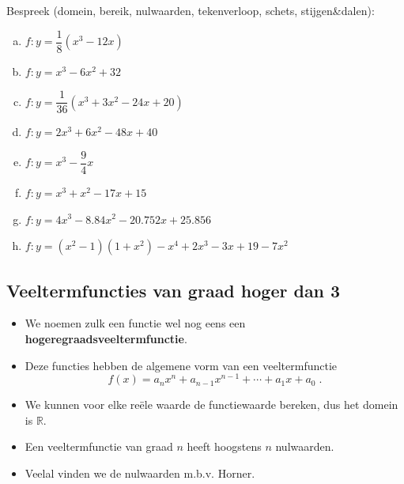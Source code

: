 \documentclass[12pt,twoside,a4paper]{article}
\begin{document}
\begin{oefening}
Bespreek (domein, bereik, nulwaarden, tekenverloop, schets, stijgen\&dalen):
\begin{multicols}{2}
\begin{enumerate}[(a)]
  \itemsep.8em
  \item $f:y=\dfrac{1}{8}(x^3-12x)$
  \item $f:y=x^3-6x^2+32$
  \item $f:y=\dfrac{1}{36}(x^3+3x^2-24x+20)$
  \item $f:y=2x^3+6x^2-48x+40$
  \item $f:y=x^3-\dfrac{9}{4}x$
  \item $f:y=x^3+x^2-17x+15$
  \item $f:y=4x^3-8.84x^2-20.752x+25.856$
  \item $f:y=(x^2-1)(1+x^2)-x^4+2x^3-3x+19-7x^2$
\end{enumerate}
\end{multicols}
\end{oefening}

\subsection{Veeltermfuncties van graad hoger dan 3}

\begin{itemize}
\item We noemen zulk een functie wel nog eens een {\bf hogeregraadsveeltermfunctie}.
\item Deze functies hebben de algemene vorm van een veeltermfunctie
  $$f(x)= a_nx^n + a_{n-1}x^{n-1} + \cdots + a_1x + a_0\;.$$
\item We kunnen voor elke reële waarde de functiewaarde bereken, dus het domein is $\mathbb{R}$.
\item Een veeltermfunctie van graad $n$ heeft hoogstens $n$ nulwaarden.
\item Veelal vinden we de nulwaarden m.b.v. Horner.
\end{itemize}

\needspace{4cm}
\end{document}
